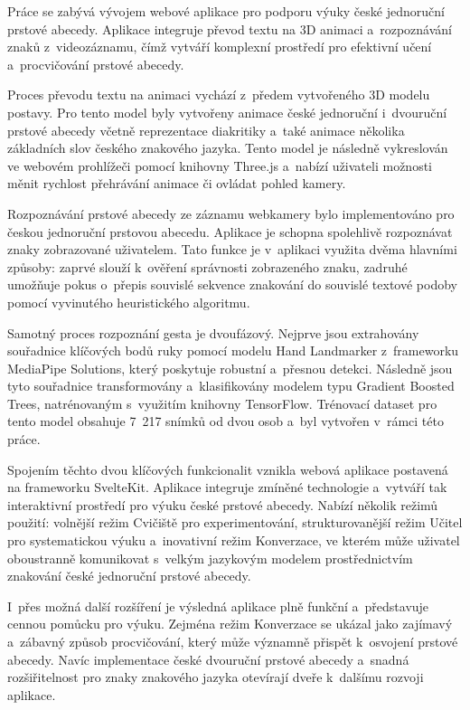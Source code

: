 \documentclass[
  master,
  program=ainfvs,
  biblatex,
  figures=true,
  tables=false,
  sourcecodes=true,
  glossaries,
  index
]{kidiplom}
\begin{document}
\begin{kiconclusions}
    Práce se zabývá vývojem webové aplikace pro podporu výuky české jednoruční prstové abecedy. Aplikace integruje převod textu na 3D animaci a~rozpoznávání znaků z~videozáznamu, čímž vytváří komplexní prostředí pro efektivní učení a~procvičování prstové abecedy.

    Proces převodu textu na animaci vychází z~předem vytvořeného 3D modelu postavy. Pro tento model byly vytvořeny animace české jednoruční i~dvouruční prstové abecedy včetně reprezentace diakritiky a~také animace několika základních slov českého znakového jazyka. Tento model je následně vykreslován ve webovém prohlížeči pomocí knihovny Three.js a~nabízí uživateli možnosti měnit rychlost přehrávání animace či ovládat pohled kamery.
    
    Rozpoznávání prstové abecedy ze záznamu webkamery bylo implementováno pro českou jednoruční prstovou abecedu. Aplikace je schopna spolehlivě rozpoznávat znaky zobrazované uživatelem. Tato funkce je v~aplikaci využita dvěma hlavními způsoby: zaprvé slouží k~ověření správnosti zobrazeného znaku, zadruhé umožňuje pokus o~přepis souvislé sekvence znakování do souvislé textové podoby pomocí vyvinutého heuristického algoritmu.
    
    Samotný proces rozpoznání gesta je dvoufázový. Nejprve jsou extrahovány souřadnice klíčových bodů ruky pomocí modelu Hand Landmarker z~frameworku MediaPipe Solutions, který poskytuje robustní a~přesnou detekci. Následně jsou tyto souřadnice transformovány a~klasifikovány modelem typu Gradient Boosted Trees, natrénovaným s~využitím knihovny TensorFlow. Trénovací dataset pro tento model obsahuje 7~217 snímků od dvou osob a~byl vytvořen v~rámci této práce.
    
    Spojením těchto dvou klíčových funkcionalit vznikla webová aplikace postavená na frameworku SvelteKit. Aplikace integruje zmíněné technologie a~vytváří tak interaktivní prostředí pro výuku české prstové abecedy. Nabízí několik režimů použití: volnější režim Cvičiště pro experimentování, strukturovanější režim Učitel pro systematickou výuku a~inovativní režim Konverzace, ve kterém může uživatel oboustranně komunikovat s~velkým jazykovým modelem prostřednictvím znakování české jednoruční prstové abecedy.
    
    I~přes možná další rozšíření je výsledná aplikace plně funkční a~představuje cennou pomůcku pro výuku. Zejména režim Konverzace se ukázal jako zajímavý a~zábavný způsob procvičování, který může významně přispět k~osvojení prstové abecedy. Navíc implementace české dvouruční prstové abecedy a~snadná rozšiřitelnost pro znaky znakového jazyka otevírají dveře k~dalšímu rozvoji aplikace.
\end{kiconclusions}
\end{document}
